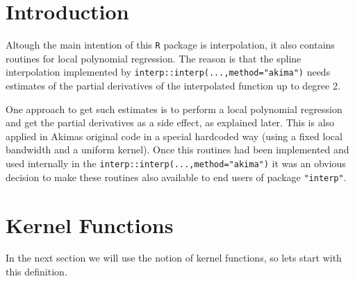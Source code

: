 \documentclass[nojss]{jss}
\def\cmd{\lstinline[basicstyle=\ttfamily,keywordstyle={},breaklines=true,breakatwhitespace=false]}
\begin{document}
\section[Introduction]{Introduction}
\label{sec:intro}
Altough the main intention of this \cmd{R} package is
interpolation, it also contains routines for local polynomial
regression. The reason is that the spline interpolation implemented by
\cmd{interp::interp(...,method="akima")} needs estimates of the
partial derivatives of the interpolated function up to degree 2.

One approach to get such estimates is to perform a local polynomial
regression \citep[see e.g.][p. 19]{fan1996local} and get the 
partial derivatives as a side
effect, as explained later. This is also applied in Akimas original
code in a special hardcoded way (using a fixed local bandwidth and a
uniform kernel). Once this routines had been implemented and used
internally in the \cmd{interp::interp(...,method="akima")} it was an
obvious decision to make these routines also available to end users of
package \cmd{"interp"}.

\section{Kernel Functions}
\label{sec:kernel}
In the next section we will use the notion of kernel functions, so
lets start with this definition.
\end{document}
